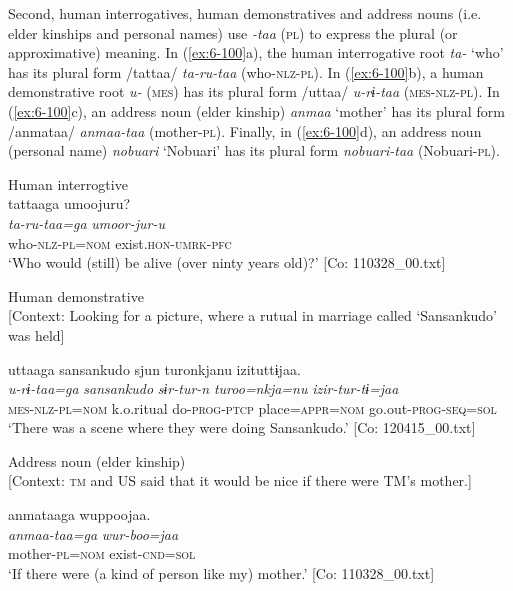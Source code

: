   Second, human interrogatives, human demonstratives and address nouns (i.e. elder kinships and personal names) use \textit{-taa} (\textsc{pl}) to express the plural (or approximative) meaning. In (\ref{ex:6-100}a), the human interrogative root \textit{ta-} ‘who’ has its plural form /tattaa/ \textit{ta-ru-taa} (who-\textsc{nlz}-\textsc{pl}). In (\ref{ex:6-100}b), a human demonstrative root \textit{u-} (\textsc{mes}) has its plural form /uttaa/ \textit{u-rɨ-taa} (\textsc{mes}-\textsc{nlz}-\textsc{pl}). In (\ref{ex:6-100}c), an address noun (elder kinship) \textit{anmaa} ‘mother’ has its plural form /anmataa/ \textit{anmaa-taa} (mother-\textsc{pl}). Finally, in (\ref{ex:6-100}d), an address noun (personal name) \textit{nobuari} ‘Nobuari’ has its plural form \textit{nobuari-taa} (Nobuari-\textsc{pl}).

\ea\label{ex:6-100}
 \ea Human interrogtive\\
{\US}
\glll tattaaga  umoojuru?\\
      \textit{ta-ru-taa=ga}  \textit{umoor-jur-u}\\
      who-\textsc{nlz}-\textsc{pl}=\textsc{nom}  exist.\textsc{hon}-\textsc{umrk}-\textsc{pfc}\\
\glt ‘Who would (still) be alive (over ninty years old)?’ [Co: 110328\_00.txt]

\ex Human demonstrative\\{}
[Context: Looking for a picture, where a rutual in marriage called ‘Sansankudo’ was held]

{\TM}
\glll uttaaga  {\textbar}sansankudo{\textbar}  sjun  turonkjanu      izituttɨjaa.\\
      \textit{u-rɨ-taa=ga}  \textit{sansankudo}  \textit{sɨr-tur-n}  \textit{turoo=nkja=nu}    \textit{izir-tur-tɨ=jaa}\\
      \textsc{mes}-\textsc{nlz}-\textsc{pl}=\textsc{nom}  k.o.ritual  do-\textsc{prog}-\textsc{ptcp}  place=\textsc{appr}=\textsc{nom}      go.out-\textsc{prog}-\textsc{seq}=\textsc{sol}\\
\glt ‘There was a scene where they were doing Sansankudo.’ [Co: 120415\_00.txt]

\ex Address noun (elder kinship)\\{}
[Context: \textsc{tm} and US said that it would be nice if there were TM’s mother.]

{\TM}
\glll anmataaga  wuppoojaa.\\
      \textit{anmaa-taa=ga}  \textit{wur-boo=jaa}\\
      mother-\textsc{pl}=\textsc{nom}  exist-\textsc{cnd}=\textsc{sol}\\
\glt ‘If there were (a kind of person like my) mother.’ [Co: 110328\_00.txt]


